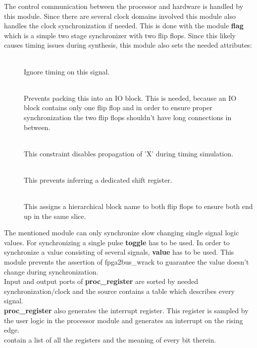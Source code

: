 \documentclass[11pt,technote,a4paper,onecolumn,dvips]{IEEEtran}
\newcommand{\signal}[1]{{\ttfamily #1}}
\newcommand{\module}[1]{{\ttfamily\bfseries #1}}
\begin{document}
The control communication between the processor and hardware is handled by this
module. Since there are several clock domains involved this module also handles
the clock synchronization if needed. This is done with the module \module{flag}
which is a simple two stage synchronizer with two flip flops. Since this likely
causes timing issues during synthesis, this module also sets the needed
attributes:
\begin{description}
    \item[] \hfill \\
        Ignore timing on this signal.
    \item[] \hfill \\
        Prevents packing this into an IO block. This is needed,
        because an IO block contains only one flip flop and in order to ensure
        proper synchronization the two flip flops shouldn't have long
        connections in between.
    \item[] \hfill \\
        This constraint disables propagation of 'X' during timing simulation.
    \item[] \hfill \\
        This prevents inferring a dedicated shift register.
    \item[] \hfill \\
        This assigns a hierarchical block name to both flip flops to ensure
        both end up in the same slice.
\end{description}
The mentioned module can only synchronize slow changing single signal logic
values. For
synchronizing a single pulse \module{toggle} has to be used. In order to
synchronize a value consisting of several signals, \module{value} has to
be used. This module prevents the assertion of \signal{fpga2bus\_wrack}
to guarantee the value doesn't change during synchronization.\\
Input and output ports of \module{proc\_register} are sorted by
needed synchronization/clock and the source contains a table which describes
every signal.\\
\module{proc\_register} also generates the interrupt register. This register
is sampled by the user logic in the processor module and generates an
interrupt on the rising edge.\\
 contain a list of all the registers and the meaning of
every bit therein.
\end{document}
